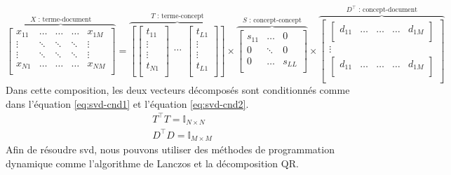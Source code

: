 \documentclass{KodeBook}
\begin{document}
\begin{equation}
\overbrace{
	\begin{bmatrix}
	x_{11} & \ldots & \ldots & \ldots & x_{1M} \\ 
	\vdots & \ddots & \ddots & \ddots &\vdots \\
	\vdots & \ddots & \ddots & \ddots &\vdots \\
	x_{N1} & \ldots & \ldots & \ldots & x_{NM} \\ 
	\end{bmatrix}
}^{X \text{ : terme-document}}
=
\overbrace{
	\left[
	\begin{bmatrix}
	t_{11} \\ 
	\vdots \\
	\vdots \\
	t_{N1} \\ 
	\end{bmatrix}
	\begin{matrix}
	\ldots \\ 
	\end{matrix}
	\begin{bmatrix}
	t_{L1} \\ 
	\vdots \\
	\vdots \\
	t_{L1} \\ 
	\end{bmatrix}
	\right]
}^{T \text{ : terme-concept}}
\times 
\overbrace{
	\begin{bmatrix}
	s_{11} & \ldots & 0 \\
	0 & \ddots & 0 \\
	0 & \ldots & s_{LL} \\
	\end{bmatrix}
}^{S \text{ : concept-concept}}
\times 
\overbrace{
	\begin{bmatrix}
	\begin{bmatrix}
	d_{11} & \ldots & \ldots & \ldots & d_{1M} \\
	\end{bmatrix}\\
	\vdots \\
	\begin{bmatrix}
	d_{11} & \ldots & \ldots & \ldots & d_{1M} \\
	\end{bmatrix}\\
	\end{bmatrix}
}^{D^\top \text{ : concept-document}}
\label{eq:svd}
\end{equation}
Dans cette composition, les deux vecteurs décomposés sont conditionnés comme dans l'équation \ref{eq:svd-cnd1} et l'équation \ref{eq:svd-cnd2}. 
\begin{align}
T^\top T = \mathbb{I}_{N \times N} \label{eq:svd-cnd1} \\
D^\top D = \mathbb{I}_{M \times M} \label{eq:svd-cnd2}
\end{align}
Afin de résoudre \ac{svd}, nous pouvons utiliser des méthodes de programmation dynamique comme l'algorithme de Lanczos et la décomposition QR.
\end{document}
